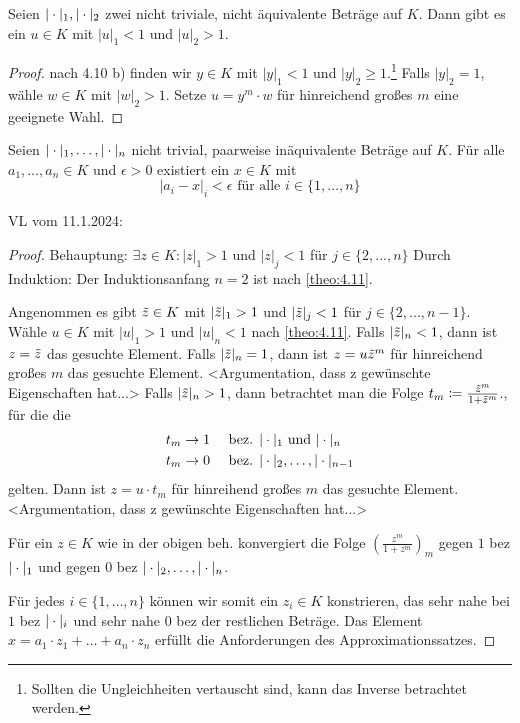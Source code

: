 \documentclass[../main.tex]{subfiles}
\begin{document}
\begin{corollary}\label{theo:4.11}
    Seien $|\cdot|_1,|\cdot|_2$ zwei nicht triviale, nicht äquivalente Beträge auf $K$. Dann gibt es ein $u\in K$ mit $|u|_1 < 1$ und $|u|_2 > 1$.
\end{corollary}
\begin{proof}
    nach 4.10 b) finden wir $y\in K$ mit $|y|_1 <1$ und $|y|_2\geq 1$.\footnote{Sollten die Ungleichheiten vertauscht sind, kann das Inverse betrachtet werden.}
     Falls $|y|_2 = 1$, wähle $w\in K$ mit $|w|_2>1$.
     Setze $u=y^m\cdot w$ für hinreichend großes $m$ eine geeignete Wahl.
\end{proof}

\begin{theorem}[Approximationssatz]
    Seien $|\cdot|_1, \dots,|\cdot|_n$ nicht trivial, paarweise inäquivalente Beträge auf $K$.
    Für alle $a_1,\dots, a_n\in K$ und $\epsilon > 0$ existiert ein $x\in K$ mit $$|a_i-x|_i <\epsilon \text{ für alle } i\in \{1,\dots,n\}$$
\end{theorem}

\begin{flushright}
VL vom 11.1.2024:
\end{flushright}

\begin{proof}
    Behauptung: $\exists z\in K: |z|_1 > 1$ und $|z|_j<1$ für $j\in \{2,...,n\}$
    Durch Induktion: Der Induktionsanfang $n=2$ ist nach \ref{theo:4.11}\checkmark.

    Angenommen es gibt $\Tilde{z}\in K$ mit $|\Tilde{z}|_1 > 1$ und $|\Tilde{z}|_j <1$ für $j\in \{2,...,n-1\}$.
    Wähle $u\in K$ mit $|u|_1>1$ und $|u|_n<1$ nach \ref{theo:4.11}.
    Falls $|\Tilde{z}|_n<1$, dann ist $z=\Tilde{z}$ das gesuchte Element.
    Falls $|\Tilde{z}|_n = 1$, dann ist $z=u\Tilde{z}^m$ für hinreichend großes $m$ das gesuchte Element.
    <Argumentation, dass z gewünschte Eigenschaften hat...>
    Falls $|\Tilde{z}|_n > 1$, dann betrachtet man die Folge $t_m\coloneqq \frac{\Tilde{z}^m}{1+\Tilde{z}^m}$., für die die
    \begin{align*}
        t_m\rightarrow 1\quad &\text{ bez. }|\cdot|_1\text{ und }|\cdot|_n\\
        t_m\rightarrow 0\quad&\text{ bez. }|\cdot|_2,\dots,|\cdot|_{n-1}
    \end{align*}
    gelten.
    Dann ist $z=u\cdot t_m$ für hinreihend großes $m$ das gesuchte Element.
    <Argumentation, dass z gewünschte Eigenschaften hat...>

    Für ein $z\in K$ wie in der obigen beh. konvergiert die Folge $(\frac{z^m}{1+z^m})_m$ gegen $1$ bez $|\cdot|_1$ und gegen $0$ bez $|\cdot|_2,\dots,|\cdot|_n$.

    Für jedes $i\in \{1,\dots,n\}$ können wir somit ein $z_i\in K$ konstrieren, das sehr nahe bei $1$ bez $|\cdot|_i$ und sehr nahe $0$ bez der restlichen Beträge.
    Das Element $x=a_1\cdot z_1 + \dots +a_n\cdot z_n$ erfüllt die Anforderungen des Approximationssatzes. 
\end{proof}
\end{document}
